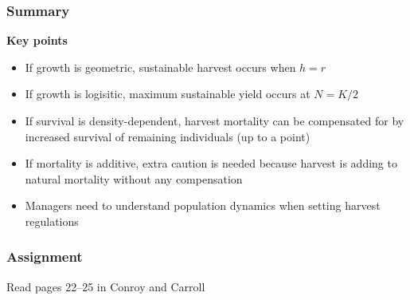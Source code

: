 \documentclass[color=usenames,dvipsnames]{beamer}\usepackage[]{graphicx}\usepackage[]{color}
\begin{document}
\begin{frame}
  \frametitle{Summary}
  {\bf Key points}
  \begin{itemize}
    \item If growth is geometric, sustainable harvest occurs when $h=r$
    \item If growth is logisitic, maximum sustainable yield occurs at $N=K/2$
    \item If survival is density-dependent, harvest mortality can be
      compensated for by increased survival of remaining individuals
      (up to a point)
    \item If mortality is additive, extra caution is needed
      because harvest is adding to natural mortality without any
      compensation
    \item Managers need to understand population dynamics when setting
      harvest regulations
  \end{itemize}
\end{frame}



\begin{frame}
  \frametitle{Assignment}
  \huge \centering
  Read pages 22--25 in Conroy and Carroll
\end{frame}




\end{document}
